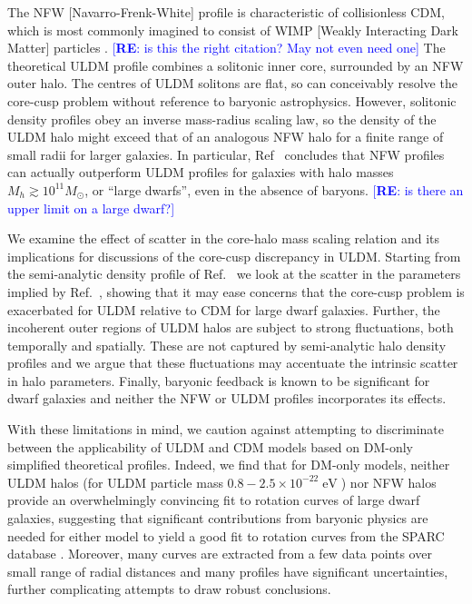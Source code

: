 \documentclass{pasa}%
\newcommand{\re}[1]{\textcolor{blue}{[{\bf RE}: #1]}}
\begin{document}
The NFW [Navarro-Frenk-White] profile \cite{Navarro:1995iw} is characteristic of collisionless CDM, which is most commonly imagined to consist of WIMP [Weakly Interacting Dark Matter] particles \cite{Robles:2018fur}. \re{is this the right citation? May not even need one} The theoretical ULDM profile combines a solitonic inner core, surrounded by an NFW outer halo. The centres of ULDM solitons are flat, so can conceivably resolve the core-cusp problem without reference to baryonic astrophysics.   However, solitonic density profiles obey an inverse mass-radius scaling law, so the density of the ULDM halo might exceed that of an analogous NFW halo for a finite range of small radii for larger galaxies. In particular, Ref~\cite{Robles:2018fur} concludes that NFW profiles can actually outperform ULDM profiles for galaxies with halo masses $M_h \gtrsim 10^{11} M_{\odot}$, or ``large dwarfs'', even in the absence of baryons. \re{is there an upper limit on a large dwarf?}  




We examine the effect of scatter in the core-halo mass scaling relation and its implications for discussions of the core-cusp discrepancy in ULDM. Starting from the semi-analytic density profile of Ref.~\cite{Robles:2018fur} we look at the scatter in the parameters  implied by Ref.~\cite{Schive:2014hza}, showing that it may ease concerns that the core-cusp problem is  exacerbated for ULDM relative to CDM for large dwarf galaxies. Further, the incoherent outer regions of ULDM halos are subject to strong fluctuations, both temporally and spatially. These are not captured by semi-analytic halo density profiles and we argue that these fluctuations  may accentuate the intrinsic scatter in halo parameters. Finally,  baryonic feedback is known to be significant for dwarf galaxies \cite{2018MNRAS.473.5698D, Benitez-Llambay:2018} and neither the NFW or ULDM profiles incorporates its effects. 

With these limitations in mind, we caution against attempting to discriminate between the applicability of ULDM and CDM models based on DM-only simplified theoretical profiles. Indeed, we find that for DM-only models, neither ULDM halos (for ULDM particle mass $0.8-2.5\times 10^{-22} \operatorname{eV}$) nor NFW halos provide an overwhelmingly convincing fit to rotation curves of large dwarf galaxies, suggesting that significant contributions from baryonic physics are needed for either model to yield a good fit to rotation curves from the SPARC database \cite{Lelli:2016zqa}. Moreover,  many curves are extracted from a few data points over small range of radial distances and many profiles have significant uncertainties, further complicating attempts to draw robust conclusions.  
\end{document}
